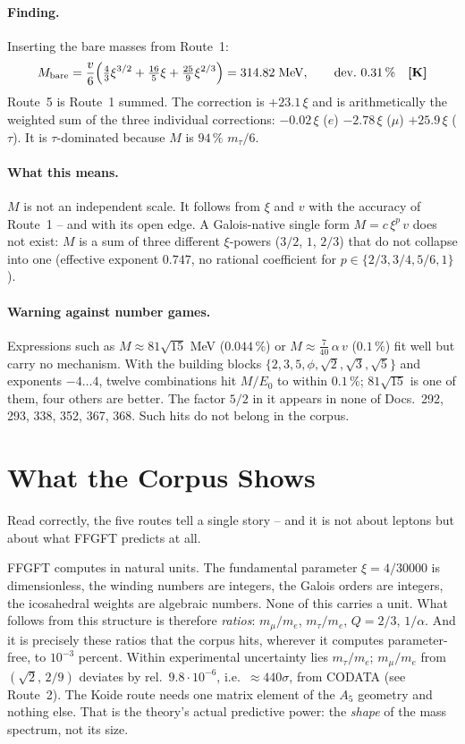 \paragraph{Finding.}
Inserting the bare masses from Route~1:
\[
  M_\text{bare} = \frac{v}{6}\Bigl(\tfrac{4}{3}\xi^{3/2} + \tfrac{16}{5}\xi
  + \tfrac{25}{9}\xi^{2/3}\Bigr) = 314{.}82\;\text{MeV}, \qquad
  \text{dev.\ } 0{.}31\,\% \quad \textbf{[K]}
\]
Route~5 is Route~1 summed. The correction is $+23{.}1\,\xi$ and is
arithmetically the weighted sum of the three individual corrections:
$-0{.}02\,\xi$ ($e$) $-2{.}78\,\xi$ ($\mu$) $+25{.}9\,\xi$ ($\tau$).
It is $\tau$-dominated because $M$ is $94\,\%$ $m_\tau/6$.

\paragraph{What this means.}
$M$ is not an independent scale. It follows from $\xi$ and $v$ with the
accuracy of Route~1 -- and with its open edge. A Galois-native single form
$M = c\,\xi^p\,v$ does not exist: $M$ is a sum of three different $\xi$-powers
($3/2$, $1$, $2/3$) that do not collapse into one (effective exponent
$0{.}747$, no rational coefficient for $p\in\{2/3,3/4,5/6,1\}$).

\paragraph{Warning against number games.}
Expressions such as $M \approx 81\sqrt{15}$ MeV ($0{.}044\,\%$) or
$M \approx \tfrac{7}{40}\,\alpha\,v$ ($0{.}1\,\%$) fit well but carry no
mechanism. With the building blocks $\{2,3,5,\phi,\sqrt2,\sqrt3,\sqrt5\}$
and exponents $-4\ldots4$, twelve combinations hit $M/E_0$ to within
$0{.}1\,\%$; $81\sqrt{15}$ is one of them, four others are better. The factor
$5/2$ in it appears in none of Docs.~292, 293, 338, 352, 367, 368. Such hits
do not belong in the corpus.

\section{What the Corpus Shows}

Read correctly, the five routes tell a single story -- and it is not about
leptons but about what FFGFT predicts at all.

FFGFT computes in natural units. The fundamental parameter $\xi = 4/30000$ is
dimensionless, the winding numbers are integers, the Galois orders are integers,
the icosahedral weights are algebraic numbers. None of this carries a unit. What
follows from this structure is therefore \emph{ratios}: $m_\mu/m_e$,
$m_\tau/m_e$, $Q = 2/3$, $1/\alpha$. And it is precisely these ratios that the
corpus hits, wherever it computes parameter-free, to $10^{-3}$ percent. Within
experimental uncertainty lies $m_\tau/m_e$; $m_\mu/m_e$ from $(\sqrt2,\,2/9)$
deviates by rel.\ $9.8\cdot10^{-6}$, i.e.\ ${\approx}440\sigma$, from CODATA
(see Route~2). The Koide route needs one matrix element of the $A_5$
geometry and nothing else. That is the theory's actual predictive power: the
\emph{shape} of the mass spectrum, not its size.

